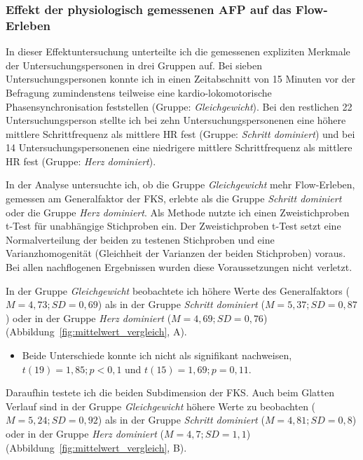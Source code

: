 \subsubsection{Effekt der physiologisch gemessenen AFP auf das Flow-Erleben} %
\label{ssub:effekt_der_physiologisch_gemessenen_afp}

In dieser Effektuntersuchung unterteilte ich die gemessenen expliziten Merkmale der Untersuchungspersonen in drei Gruppen auf. Bei sieben Untersuchungspersonen konnte ich in einen Zeitabschnitt von 15 Minuten vor der Befragung zumindenstens teilweise eine kardio-lokomotorische Phasensynchronisation feststellen (Gruppe: \emph{Gleichgewicht}). Bei den restlichen 22 Untersuchungsperson stellte ich bei zehn Untersuchungspersonenen eine höhere mittlere Schrittfrequenz als mittlere \ac{HR} fest (Gruppe: \emph{Schritt dominiert}) und bei 14 Untersuchungspersonenen eine niedrigere mittlere Schrittfrequenz als mittlere \ac{HR} fest (Gruppe: \emph{Herz dominiert}).

In der Analyse untersuchte ich, ob die Gruppe \emph{Gleichgewicht} mehr Flow-Erleben, gemessen am Generalfaktor der \ac{FKS}, erlebte als die Gruppe \emph{Schritt dominiert} oder die Gruppe \emph{Herz dominiert}. Als Methode nutzte ich einen Zweistichproben t-Test für unabhängige Stichproben ein. Der Zweistichproben t-Test setzt eine Normalverteilung der beiden zu testenen Stichproben und eine Varianzhomogenität (Gleichheit der Varianzen der beiden Stichproben) voraus. Bei allen nachflogenen Ergebnissen wurden diese Voraussetzungen nicht verletzt. 

In der Gruppe \emph{Gleichgewicht} beobachtete ich höhere Werte des Generalfaktors ($M = 4{,}73; SD = 0{,}69$) als in der Gruppe \emph{Schritt dominiert} ($M = 5{,}37; SD = 0{,}87$) oder in der Gruppe \emph{Herz dominiert} ($M = 4{,}69; SD = 0{,}76$) (Abbildung~\ref{fig:mittelwert_vergleich}, A). 

\begin{itemize}

	\item Beide Unterschiede konnte ich nicht als signifikant nachweisen, $t(19) = 1{,}85; p < 0{,}1$ und $t(15) = 1{,}69; p = 0{,}11$.

\end{itemize}

Daraufhin testete ich die beiden Subdimension der \ac{FKS}. Auch beim Glatten Verlauf sind in der Gruppe \emph{Gleichgewicht} höhere Werte zu beobachten ($M = 5{,}24; SD = 0{,}92$) als in der Gruppe \emph{Schritt dominiert} ($M = 4{,}81; SD = 0{,}8$) oder in der Gruppe \emph{Herz dominiert} ($M = 4{,}7; SD = 1{,}1$) (Abbildung~\ref{fig:mittelwert_vergleich}, B). 

